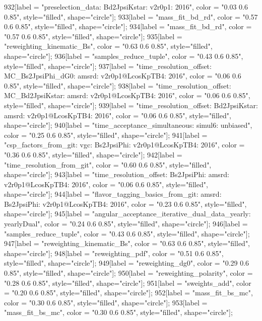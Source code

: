 {	932[label = "preselection_data\nmode: Bd2JpsiKstar\nversion: v2r0p1\nyear: 2016", color = "0.03 0.6 0.85", style="filled", shape="circle"];
	933[label = "mass_fit_bd_rd", color = "0.57 0.6 0.85", style="filled", shape="circle"];
	934[label = "mass_fit_bd_rd", color = "0.57 0.6 0.85", style="filled", shape="circle"];
	935[label = "reweighting_kinematic_Bs", color = "0.63 0.6 0.85", style="filled", shape="circle"];
	936[label = "samples_reduce_tuple", color = "0.43 0.6 0.85", style="filled", shape="circle"];
	937[label = "time_resolution_offset\nmode: MC_Bs2JpsiPhi_dG0\ntimeres: amsrd\nversion: v2r0p1@LcosKpTB4\nyear: 2016", color = "0.06 0.6 0.85", style="filled", shape="circle"];
	938[label = "time_resolution_offset\nmode: MC_Bd2JpsiKstar\ntimeres: amsrd\nversion: v2r0p1@LcosKpTB4\nyear: 2016", color = "0.06 0.6 0.85", style="filled", shape="circle"];
	939[label = "time_resolution_offset\nmode: Bd2JpsiKstar\ntimeres: amsrd\nversion: v2r0p1@LcosKpTB4\nyear: 2016", color = "0.06 0.6 0.85", style="filled", shape="circle"];
	940[label = "time_acceptance_simultaneous\ntimeacc: simul6\ntrigger: unbiased", color = "0.25 0.6 0.85", style="filled", shape="circle"];
	941[label = "csp_factors_from_git\ncsp: vgc\nmode: Bs2JpsiPhi\nversion: v2r0p1@LcosKpTB4\nyear: 2016", color = "0.36 0.6 0.85", style="filled", shape="circle"];
	942[label = "time_resolution_from_git", color = "0.60 0.6 0.85", style="filled", shape="circle"];
	943[label = "time_resolution_offset\nmode: Bs2JpsiPhi\ntimeres: amsrd\nversion: v2r0p1@LcosKpTB4\nyear: 2016", color = "0.06 0.6 0.85", style="filled", shape="circle"];
	944[label = "flavor_tagging_basics_from_git\nflavor: amsrd\nmode: Bs2JpsiPhi\nversion: v2r0p1@LcosKpTB4\nyear: 2016", color = "0.23 0.6 0.85", style="filled", shape="circle"];
	945[label = "angular_acceptance_iterative_dual_data_yearly\nangacc: yearlyDual", color = "0.24 0.6 0.85", style="filled", shape="circle"];
	946[label = "samples_reduce_tuple", color = "0.43 0.6 0.85", style="filled", shape="circle"];
	947[label = "reweighting_kinematic_Bs", color = "0.63 0.6 0.85", style="filled", shape="circle"];
	948[label = "reweighting_pdf", color = "0.51 0.6 0.85", style="filled", shape="circle"];
	949[label = "reweighting_dg0", color = "0.29 0.6 0.85", style="filled", shape="circle"];
	950[label = "reweighting_polarity", color = "0.28 0.6 0.85", style="filled", shape="circle"];
	951[label = "sweights_add", color = "0.20 0.6 0.85", style="filled", shape="circle"];
	952[label = "mass_fit_bs_mc", color = "0.30 0.6 0.85", style="filled", shape="circle"];
	953[label = "mass_fit_bs_mc", color = "0.30 0.6 0.85", style="filled", shape="circle"];
}
